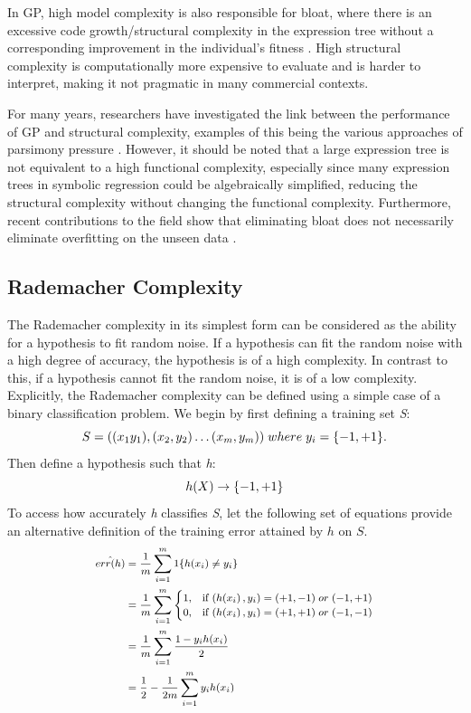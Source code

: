 \documentclass[conference]{IEEEtran}
\begin{document}
In GP, high model complexity is also responsible for bloat, where there is an excessive code growth/structural complexity in the expression tree without a corresponding improvement in the individual's fitness \cite{b7}. High structural complexity is computationally more expensive to evaluate and is harder to interpret, making it not pragmatic in many commercial contexts.

For many years, researchers have investigated the link between the performance of GP and structural complexity, examples of this being the various approaches of parsimony pressure \cite{b8}\cite{b9}. However, it should be noted that a large expression tree is not equivalent to a high functional complexity, especially since many expression trees in symbolic regression could be algebraically simplified, reducing the structural complexity without changing the functional complexity. Furthermore, recent contributions to the field show that eliminating bloat does not necessarily eliminate overfitting on the unseen data \cite{b10}. 

\subsection{Rademacher Complexity}

The Rademacher complexity in its simplest form can be considered as the ability for a hypothesis to fit random noise. If a hypothesis can fit the random noise with a high degree of accuracy, the hypothesis is of a high complexity. In contrast to this, if a hypothesis cannot fit the random noise, it is of a low complexity. Explicitly, the Rademacher complexity can be defined using a simple case of a binary classification problem. We begin by first defining a training set \textit{S}: 
\begin{equation}
\footnotesize
	S = ((x_{1} y_{1}),(x_{2}, y_{2}) \dots (x_{m}, y_{m})) \;where\; y_{i} = \{-1, +1\}\nonumber.
\end{equation}
Then define a hypothesis such that \textit{h}:
\begin{equation}
\footnotesize h(X) \rightarrow \{-1, +1\}\nonumber
\end{equation}
To access how accurately \textit{h} classifies \textit{S}, let the following set of equations provide an alternative definition of the training error attained by $h$ on $S$.
\begin{equation}\label{training_error}
\footnotesize
\begin{aligned}
\hat{err(h)} 
& = \frac{1}{m}\sum\limits_{i=1}^m 1 \{h(x_{i}) \neq y_{i}\}\\
& = \frac{1}{m}\sum\limits_{i=1}^m
	\begin{cases}
    1, & \text{if $\left(h(x_{i}\right), y_{i}) = (+1,-1)\;or\;(-1,+1)$}\\
    0, & \text{if $\left(h(x_{i}\right), y_{i}) = (+1,+1)\;or\;(-1,-1)$}
	\end{cases}\\
& = \frac{1}{m}\sum\limits_{i=1}^m \frac{1 - y_{i}h(x_{i})}{2}\\
& = \frac{1}{2} - \frac{1}{2m}\sum\limits_{i=1}^m y_{i}h(x_{i})
\end{aligned}
\end{equation}
\end{document}
